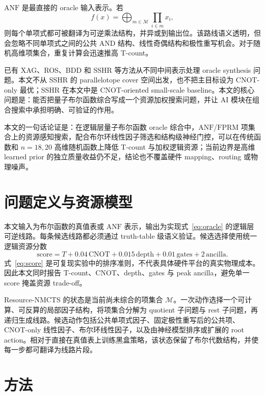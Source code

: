 \documentclass[UTF8,fontset=macnew,11pt]{ctexart}
\newcommand{\method}{Resource-NMCTS}
\newcommand{\score}{\ensuremath{\mathrm{score}}}
\newcommand{\anf}{\ensuremath{\mathrm{ANF}}}
\newcommand{\fprm}{\ensuremath{\mathrm{FPRM}}}
\begin{document}
\anf{} 是最直接的 oracle 输入表示。若
\begin{equation}
  f(x)=\bigoplus_{m\in\mathcal{M}}\prod_{i\in m}x_i ,
  \label{eq:anf}
\end{equation}
则每个单项式都可被翻译为可逆乘法结构，并异或到输出位。该路线语义透明，但会忽略不同单项式之间的公共 AND 结构、线性奇偶结构和极性重写机会。对于随机高维项集合，重复计算会迅速推高 T-count。

已有 XAG、ROS、BDD 和 SSHR 等方法从不同中间表示处理 oracle synthesis 问题\cite{meuli2022xag,meuli2020ros,wille2009bdd,zheng2025sshr}。本文不从 SSHR 的 parallelotope cover 空间出发，也不把主目标设为 CNOT-only 最优；SSHR 在本文中是 CNOT-oriented small-scale baseline。本文的核心问题是：能否把量子布尔函数综合写成一个资源加权搜索问题，并让 AI 模块在组合搜索中承担明确、可验证的作用。

本文的一句话论证是：在逻辑层量子布尔函数 oracle 综合中，\anf{}/\fprm{} 项集合上的资源感知搜索，配合布尔环线性因子筛选和结构级神经门控，可以在传统函数和 $n=18,20$ 高维随机函数上降低 T-count 与加权逻辑资源；当前边界是高维 learned prior 的独立质量收益仍不足，结论也不覆盖硬件 mapping、routing 或物理噪声。

\section{问题定义与资源模型}

本文输入为布尔函数的真值表或 \anf{} 表示，输出为实现式~\eqref{eq:oracle} 的逻辑层可逆线路。每条候选线路都必须通过 truth-table 级语义验证。候选选择使用统一逻辑资源分数
\begin{equation}
  \score = T + 0.04\,\mathrm{CNOT} + 0.015\,\mathrm{depth}
         + 0.01\,\mathrm{gates} + 2\,\mathrm{ancilla}.
  \label{eq:score}
\end{equation}
式~\eqref{eq:score} 是可复现实验中的排序准则，不代表具体硬件平台的真实物理成本。因此本文同时报告 T-count、CNOT、depth、gates 与 peak ancilla，避免单一 score 掩盖资源 trade-off。

\method{} 的状态是当前尚未综合的项集合 $\mathcal{M}$。一次动作选择一个可计算、可反算的局部因子结构，将项集合分解为 quotient 子问题与 rest 子问题，再递归生成线路。候选动作包括公共单项式因子、固定极性重写后的公共项、CNOT-only 线性因子、布尔环线性因子，以及由神经模型排序或扩展的 root action。相对于直接在真值表上训练黑盒策略，该状态保留了布尔代数结构，并使每一步都可翻译为线路片段。

\section{方法}
\end{document}
